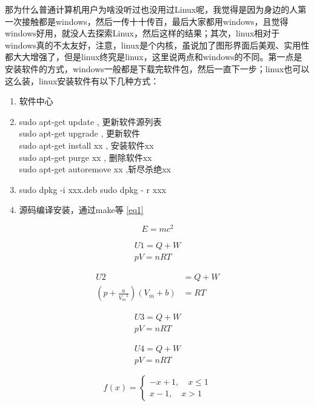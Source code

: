 \documentclass[utf8]{book}
\begin{document}
	
	那为什么普通计算机用户为啥没听过也没用过Linux呢，我觉得是因为身边的人第一次接触都是windows，然后一传十十传百，最后大家都用windows，且觉得windows好用，就没人去探索Linux，然后这样的结果；其次，linux相对于windows真的不太友好，注意，linux是个内核，虽说加了图形界面后美观、实用性都大大增强了，但是linux终究是linux，这里说两点和windows的不同。第一点是安装软件的方式，windows一般都是下载完软件包，然后一直下一步；linux也可以这么装，linux安装软件有以下几种方式：
	\begin{enumerate}
		\item 软件中心
		\item 	{sudo apt-get update , 更新软件源列表\\
		sudo apt-get upgrade , 更新软件\\
		sudo apt-get install xx , 安装软件xx\\
		sudo apt-get purge xx , 删除软件xx\\
		sudo apt-get autoremove xx ,斩尽杀绝xx\\}
		\item {sudo dpkg -i xxx.deb
		      sudo dpkg - r xxx}
	    \item 源码编译安装，通过make等 \eqref{eq1}
	\end{enumerate}

	\begin{equation} \label{eq1}
		E = mc^2
	\end{equation}
	
	\begin{gather}
		U1 = Q + W \\
		pV = nRT
	\end{gather}
	
	\begin{align}
		U2 &= Q + W \\
		(p + \frac{a}{{V_m}^2})(V_m + b) &= RT
	\end{align}
	
	\begin{multline}
		U3 = Q + W \\
		pV = nRT
	\end{multline}
	
	\[
		\begin{aligned}
		U4 = Q + W \\
		pV = nRT
		\end{aligned}
	\]
	
	
	\begin{equation}
	f(x) = 
		\begin{cases}
			-x + 1, \quad x \leq 1\\
			x - 1, \quad x > 1
		\end{cases}
	\end{equation}
\end{document}
